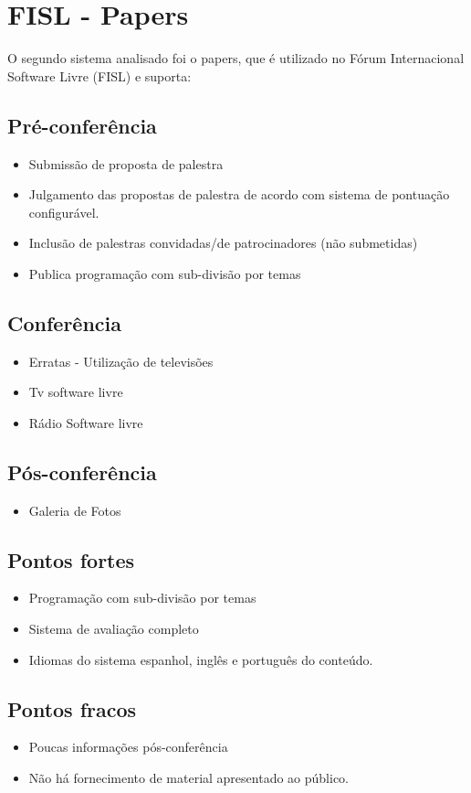 \documentclass[letter]{article}
\begin{document}
\section{FISL - Papers}
O segundo sistema analisado foi o papers, que é utilizado no Fórum Internacional Software Livre (FISL) e suporta:
\subsection{Pré-conferência}
\begin{itemize}
\item Submissão de proposta de palestra
\item Julgamento das propostas de palestra de acordo com sistema de pontuação configurável.
\item Inclusão de palestras convidadas/de patrocinadores (não submetidas)
\item Publica programação com sub-divisão por temas
\end{itemize}
\subsection{Conferência}
\begin{itemize}
\item Erratas - Utilização de televisões
\item Tv software livre
\item Rádio Software livre
\end{itemize}

\subsection{Pós-conferência}
\begin{itemize} 
\item Galeria de Fotos
\end{itemize}

\subsection{Pontos fortes}
\begin{itemize}
\item Programação com sub-divisão por temas
\item Sistema de avaliação completo
\item Idiomas do sistema espanhol, inglês e português do conteúdo.
\end{itemize}

\subsection{Pontos fracos}
\begin{itemize}
\item Poucas informações pós-conferência
\item Não há fornecimento de material apresentado ao público.
\end{itemize}
\end{document}
